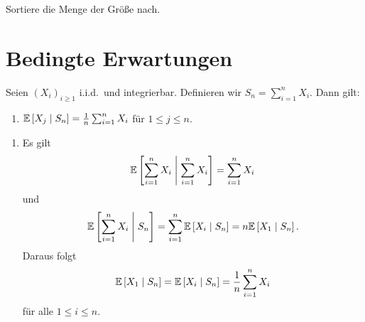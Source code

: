 \solution Sortiere die Menge der Größe nach. 


\section{Bedingte Erwartungen}



Seien $\left( X_i \right)_{i\geq 1}$ i.i.d.\ und integrierbar. Definieren wir 
$S_n = \sum_{i=1}^{n} X_i$. Dann gilt:
\begin{enumerate}
    \item $\mathbb{E} \left[ X_j \;\middle\vert\; S_n \right] = \frac{1}{n} \sum_{i=1}^{n} X_i$
        für $1\leq j \leq n$.
\end{enumerate}

\solution 
\begin{enumerate}
    \item Es gilt
        \begin{equation*}
            \mathbb{E} \left[ \sum_{i=1}^{n} X_i \;\middle\vert\; \sum_{i=1}^{n} X_i \right] 
            = \sum_{i=1}^{n} X_i
        \end{equation*}
        und
        \begin{equation*}
            \mathbb{E} \left[  \sum_{i=1}^{n} X_i \;\middle\vert\; S_n \right] =
            \sum_{i=1}^{n} \mathbb{E} \left[ X_i \;\middle\vert\; S_n \right] = 
            n \mathbb{E} \left[ X_1 \;\middle\vert\; S_n \right].
        \end{equation*}
        Daraus folgt
        \begin{equation*}
             \mathbb{E} \left[ X_1 \;\middle\vert\; S_n \right] = \mathbb{E} \left[ X_i \;\middle\vert\; S_n \right] =
             \frac{1}{n} \sum_{i=1}^{n} X_i
        \end{equation*}
        für alle $1 \leq i \leq n$. 
\end{enumerate}


